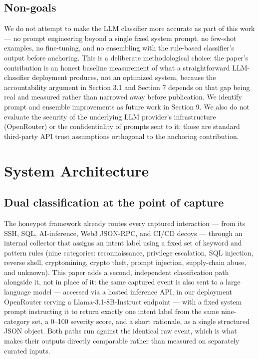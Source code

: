 \documentclass[journal,10pt,twocolumn]{IEEEtran}
\begin{document}
\subsection{Non-goals}

We do not attempt to make the LLM classifier more accurate as part of this work --- no prompt engineering beyond a single fixed system prompt, no few-shot examples, no fine-tuning, and no ensembling with the rule-based classifier's output before anchoring. This is a deliberate methodological choice: the paper's contribution is an honest baseline measurement of what a straightforward LLM-classifier deployment produces, not an optimized system, because the accountability argument in Section 3.1 and Section 7 depends on that gap being real and measured rather than narrowed away before publication. We identify prompt and ensemble improvements as future work in Section 9. We also do not evaluate the security of the underlying LLM provider's infrastructure (OpenRouter) or the confidentiality of prompts sent to it; those are standard third-party API trust assumptions orthogonal to the anchoring contribution.

\section{System Architecture}

\subsection{Dual classification at the point of capture}

The honeypot framework already routes every captured interaction --- from its SSH, SQL, AI-inference, Web3 JSON-RPC, and CI/CD decoys --- through an internal collector that assigns an intent label using a fixed set of keyword and pattern rules (nine categories: reconnaissance, privilege escalation, SQL injection, reverse shell, cryptomining, crypto theft, prompt injection, supply-chain abuse, and unknown). This paper adds a second, independent classification path alongside it, not in place of it: the same captured event is also sent to a large language model --- accessed via a hosted inference API, in our deployment OpenRouter serving a Llama-3.1-8B-Instruct endpoint --- with a fixed system prompt instructing it to return exactly one intent label from the same nine-category set, a 0--100 severity score, and a short rationale, as a single structured JSON object. Both paths run against the identical raw event, which is what makes their outputs directly comparable rather than measured on separately curated inputs.
\end{document}
